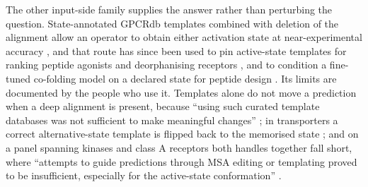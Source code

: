 The other input-side family supplies the answer rather than perturbing the question.
State-annotated GPCRdb templates combined with deletion of the alignment allow an operator to
obtain either activation state at near-experimental accuracy \citep{heo2022multistate}, and that route
has since been used to pin active-state templates for ranking peptide agonists and deorphanising
receptors \citep{ferguson2026deorphann}, and to condition a fine-tuned co-folding model on a declared
state for peptide design \citep{yang2025statespecific}. Its limits are documented by the people who use
it. Templates alone do not move a prediction when a deep alignment is present, because ``using such
curated template databases was not sufficient to make meaningful changes'' \citep[p.~1875]{heo2022multistate};
in transporters a correct alternative-state template is flipped back to the memorised state
\citep{swapna2025memorization}; and on a panel spanning kinases and class A receptors both handles
together fall short, where ``attempts to guide predictions through MSA editing or templating proved
to be insufficient, especially for the active-state conformation'' \citep[p.~18]{obendorf2026statespecific}.

